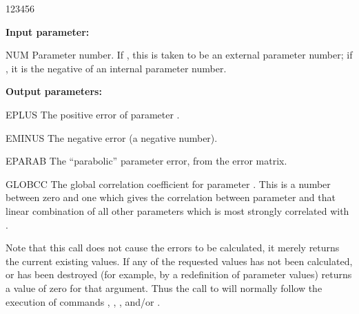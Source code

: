  
\begin{DLtt}{123456}
\item[{\rm\bf Input parameter:}]
\item[NUM]    Parameter number. 
              If , this is taken to be an external parameter number; 
              if , it is the negative of an internal parameter number.
\item[{\rm\bf Output parameters:}]
\item[EPLUS]  The positive  error of parameter .
\item[EMINUS] The negative  error (a negative number).
\item[EPARAB] The ``parabolic'' parameter error, from the error matrix.
\item[GLOBCC] The global correlation coefficient for parameter .
              This is a number between zero and one which gives the correlation
              between parameter  and that linear combination of all other
              parameters which is most strongly correlated with .
\end{DLtt}
 
Note that this call does not cause the errors to be
calculated, it merely returns the current existing values.
If any of the requested values has not been calculated, or has
been destroyed (for example, by a redefinition of parameter values)
 returns a value of zero for that argument.
Thus the call to  will normally follow the execution of
commands , , 
, and/or .
 

 
